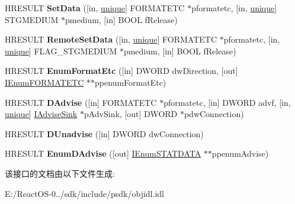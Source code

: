\begin{DoxyCompactItemize}
\item 
\mbox{\label{interface_i_data_object_abd214245ea9dc0e71584f7d68d24f31a}} 
H\+R\+E\+S\+U\+LT {\bfseries Set\+Data} (\mbox{[}in, \hyperlink{interfaceunique}{unique}\mbox{]} F\+O\+R\+M\+A\+T\+E\+TC $\ast$pformatetc, \mbox{[}in, \hyperlink{interfaceunique}{unique}\mbox{]} S\+T\+G\+M\+E\+D\+I\+UM $\ast$pmedium, \mbox{[}in\mbox{]} B\+O\+OL f\+Release)
\item 
\mbox{\label{interface_i_data_object_a34d56cfa14fabc7a9fee57eed320110e}} 
H\+R\+E\+S\+U\+LT {\bfseries Remote\+Set\+Data} (\mbox{[}in, \hyperlink{interfaceunique}{unique}\mbox{]} F\+O\+R\+M\+A\+T\+E\+TC $\ast$pformatetc, \mbox{[}in, \hyperlink{interfaceunique}{unique}\mbox{]} F\+L\+A\+G\+\_\+\+S\+T\+G\+M\+E\+D\+I\+UM $\ast$pmedium, \mbox{[}in\mbox{]} B\+O\+OL f\+Release)
\item 
\mbox{\label{interface_i_data_object_afa764948b5993ec1bc64468f88dfca0b}} 
H\+R\+E\+S\+U\+LT {\bfseries Enum\+Format\+Etc} (\mbox{[}in\mbox{]} D\+W\+O\+RD dw\+Direction, \mbox{[}out\mbox{]} \hyperlink{interface_i_enum_f_o_r_m_a_t_e_t_c}{I\+Enum\+F\+O\+R\+M\+A\+T\+E\+TC} $\ast$$\ast$ppenum\+Format\+Etc)
\item 
\mbox{\label{interface_i_data_object_acf77bd6f3d743415beff377aaaf8e63a}} 
H\+R\+E\+S\+U\+LT {\bfseries D\+Advise} (\mbox{[}in\mbox{]} F\+O\+R\+M\+A\+T\+E\+TC $\ast$pformatetc, \mbox{[}in\mbox{]} D\+W\+O\+RD advf, \mbox{[}in, \hyperlink{interfaceunique}{unique}\mbox{]} \hyperlink{interface_i_advise_sink}{I\+Advise\+Sink} $\ast$p\+Adv\+Sink, \mbox{[}out\mbox{]} D\+W\+O\+RD $\ast$pdw\+Connection)
\item 
\mbox{\label{interface_i_data_object_a4d8192ae77ade7dbb0150295822d69ae}} 
H\+R\+E\+S\+U\+LT {\bfseries D\+Unadvise} (\mbox{[}in\mbox{]} D\+W\+O\+RD dw\+Connection)
\item 
\mbox{\label{interface_i_data_object_aff83d7cb8818344b17f042d43c41d680}} 
H\+R\+E\+S\+U\+LT {\bfseries Enum\+D\+Advise} (\mbox{[}out\mbox{]} \hyperlink{interface_i_enum_s_t_a_t_d_a_t_a}{I\+Enum\+S\+T\+A\+T\+D\+A\+TA} $\ast$$\ast$ppenum\+Advise)
\end{DoxyCompactItemize}


该接口的文档由以下文件生成\+:\begin{DoxyCompactItemize}
\item 
E\+:/\+React\+O\+S-\/0../sdk/include/psdk/objidl.\+idl\end{DoxyCompactItemize}
